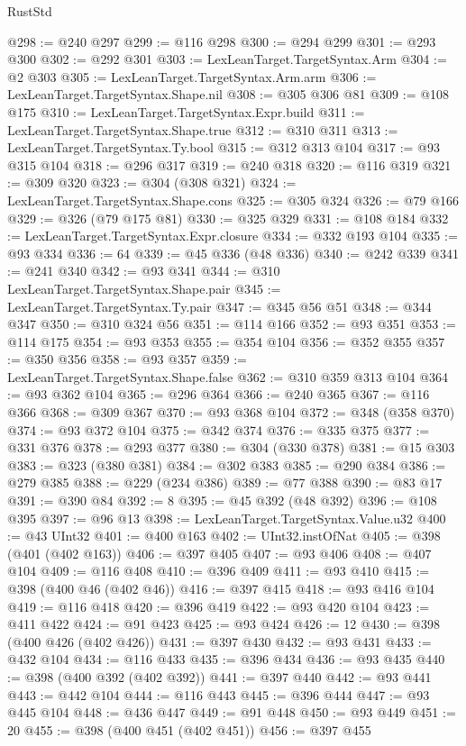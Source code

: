 \begin{lexlean}{RustStd}
\begin{coremodule}
@298 := @240 @297
@299 := @116 @298
@300 := @294 @299
@301 := @293 @300
@302 := @292 @301
@303 := LexLeanTarget.TargetSyntax.Arm
@304 := @2 @303
@305 := LexLeanTarget.TargetSyntax.Arm.arm
@306 := LexLeanTarget.TargetSyntax.Shape.nil
@308 := @305 @306 @81
@309 := @108 @175
@310 := LexLeanTarget.TargetSyntax.Expr.build
@311 := LexLeanTarget.TargetSyntax.Shape.true
@312 := @310 @311
@313 := LexLeanTarget.TargetSyntax.Ty.bool
@315 := @312 @313 @104
@317 := @93 @315 @104
@318 := @296 @317
@319 := @240 @318
@320 := @116 @319
@321 := @309 @320
@323 := @304 (@308 @321)
@324 := LexLeanTarget.TargetSyntax.Shape.cons
@325 := @305 @324
@326 := @79 @166
@329 := @326 (@79 @175 @81)
@330 := @325 @329
@331 := @108 @184
@332 := LexLeanTarget.TargetSyntax.Expr.closure
@334 := @332 @193 @104
@335 := @93 @334
@336 := 64
@339 := @45 @336 (@48 @336)
@340 := @242 @339
@341 := @241 @340
@342 := @93 @341
@344 := @310 LexLeanTarget.TargetSyntax.Shape.pair
@345 := LexLeanTarget.TargetSyntax.Ty.pair
@347 := @345 @56 @51
@348 := @344 @347
@350 := @310 @324 @56
@351 := @114 @166
@352 := @93 @351
@353 := @114 @175
@354 := @93 @353
@355 := @354 @104
@356 := @352 @355
@357 := @350 @356
@358 := @93 @357
@359 := LexLeanTarget.TargetSyntax.Shape.false
@362 := @310 @359 @313 @104
@364 := @93 @362 @104
@365 := @296 @364
@366 := @240 @365
@367 := @116 @366
@368 := @309 @367
@370 := @93 @368 @104
@372 := @348 (@358 @370)
@374 := @93 @372 @104
@375 := @342 @374
@376 := @335 @375
@377 := @331 @376
@378 := @293 @377
@380 := @304 (@330 @378)
@381 := @15 @303
@383 := @323 (@380 @381)
@384 := @302 @383
@385 := @290 @384
@386 := @279 @385
@388 := @229 (@234 @386)
@389 := @77 @388
@390 := @83 @17
@391 := @390 @84
@392 := 8
@395 := @45 @392 (@48 @392)
@396 := @108 @395
@397 := @96 @13
@398 := LexLeanTarget.TargetSyntax.Value.u32
@400 := @43 UInt32
@401 := @400 @163
@402 := UInt32.instOfNat
@405 := @398 (@401 (@402 @163))
@406 := @397 @405
@407 := @93 @406
@408 := @407 @104
@409 := @116 @408
@410 := @396 @409
@411 := @93 @410
@415 := @398 (@400 @46 (@402 @46))
@416 := @397 @415
@418 := @93 @416 @104
@419 := @116 @418
@420 := @396 @419
@422 := @93 @420 @104
@423 := @411 @422
@424 := @91 @423
@425 := @93 @424
@426 := 12
@430 := @398 (@400 @426 (@402 @426))
@431 := @397 @430
@432 := @93 @431
@433 := @432 @104
@434 := @116 @433
@435 := @396 @434
@436 := @93 @435
@440 := @398 (@400 @392 (@402 @392))
@441 := @397 @440
@442 := @93 @441
@443 := @442 @104
@444 := @116 @443
@445 := @396 @444
@447 := @93 @445 @104
@448 := @436 @447
@449 := @91 @448
@450 := @93 @449
@451 := 20
@455 := @398 (@400 @451 (@402 @451))
@456 := @397 @455

\end{coremodule}
\end{lexlean}
